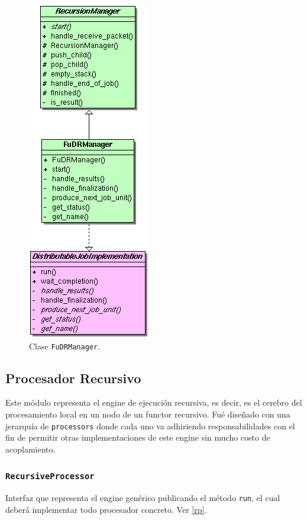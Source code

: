 \begin{figure}[ht] \hspace{4.5cm}
    \includegraphics[scale=.6]{images/fud_manager_dji.png}
    \caption{Clase \texttt{FuDRManager}.}
    \label{fud_manager_dji}
\end{figure}


\subsection{Procesador Recursivo}

Este módulo representa el engine de ejecución recursiva, es decir, es el cerebro del procesamiento local en un
nodo de un functor recursivo. Fué diseñado con una jerarquía de \texttt{processors} donde cada uno va
adhiriendo responsabilidades con el fin de permitir otras implementaciones de este engine sin mucho costo de
acoplamiento.
    
    \subsubsection{\texttt{RecursiveProcessor}}

        Interfaz que representa el engine genérico publicando el método \texttt{run}, el cual deberá
        implementar todo procesador concreto. Ver \ref{rp}.

